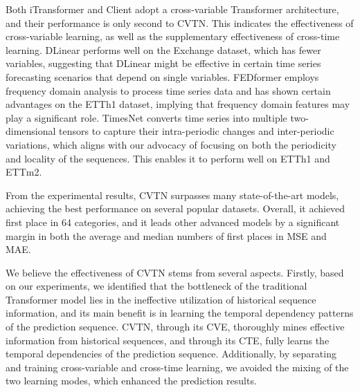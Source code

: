 Both iTransformer and Client adopt a cross-variable Transformer architecture, and their performance is only second to CVTN. This indicates the effectiveness of cross-variable learning, as well as the supplementary effectiveness of cross-time learning. DLinear performs well on the Exchange dataset, which has fewer variables, suggesting that DLinear might be effective in certain time series forecasting scenarios that depend on single variables. FEDformer employs frequency domain analysis to process time series data and has shown certain advantages on the ETTh1 dataset, implying that frequency domain features may play a significant role. TimesNet converts time series into multiple two-dimensional tensors to capture their intra-periodic changes and inter-periodic variations, which aligns with our advocacy of focusing on both the periodicity and locality of the sequences. This enables it to perform well on ETTh1 and ETTm2.

From the experimental results, CVTN surpasses many state-of-the-art models, achieving the best performance on several popular datasets. Overall, it achieved first place in 64 categories, and it leads other advanced models by a significant margin in both the average and median numbers of first places in MSE and MAE.

We believe the effectiveness of CVTN stems from several aspects. Firstly, based on our experiments, we identified that the bottleneck of the traditional Transformer model lies in the ineffective utilization of historical sequence information, and its main benefit is in learning the temporal dependency patterns of the prediction sequence. CVTN, through its CVE, thoroughly mines effective information from historical sequences, and through its CTE, fully learns the temporal dependencies of the prediction sequence. Additionally, by separating and training cross-variable and cross-time learning, we avoided the mixing of the two learning modes, which enhanced the prediction results.


